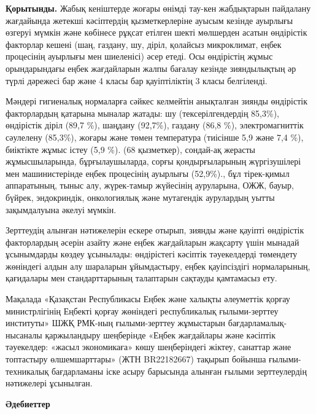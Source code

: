 \begin{multicols}{2}
{\bfseries Қорытынды.} Жабық кеніштерде жоғары өнімді тау-кен жабдықтарын
пайдалану жағдайында жетекші кәсіптердің қызметкерлеріне ауысым кезінде
ауырлығы өзгеруі мүмкін және көбінесе рұқсат етілген шекті мөлшерден
асатын өндірістік факторлар кешені (шаң, газдану, шу, діріл, қолайсыз
микроклимат, еңбек процесінің ауырлығы мен шиеленісі) әсер етеді. Осы
өндірістің жұмыс орындарындағы еңбек жағдайларын жалпы бағалау кезінде
зияндылықтың әр түрлі дәрежесі бар және 4 класы бар қауіптіліктің 3
класы белгіленді.

Мәндері гигиеналық нормаларға сәйкес келмейтін анықталған зиянды
өндірістік факторлардың қатарына мыналар жатады: шу (тексерілгендердің
85,3\%), өндірістік діріл (89,7 \%), шаңдану (92,7\%), газдану (86,8
\%), электромагниттік сәулелену (85,3\%), жоғары және төмен температура
(тиісінше 5,9 және 7,4 \%), биіктікте жұмыс істеу (5,9 \%). (68
қызметкер), сондай-ақ жерасты жұмысшыларында, бұрғылаушыларда, сорғы
қондырғыларының жүргізушілері мен машинистерінде еңбек процесінің
ауырлығы (52,9\%)., бұл тірек-қимыл аппаратының, тыныс алу, жүрек-тамыр
жүйесінің ауруларына, ОЖЖ, бауыр, бүйрек, эндокриндік, онкологиялық және
мутагендік аурулардың уытты зақымдалуына әкелуі мүмкін.

Зерттеудің алынған нәтижелерін ескере отырып, зиянды және қауіпті
өндірістік факторлардың әсерін азайту және еңбек жағдайларын жақсарту
үшін мынадай ұсынымдарды көздеу ұсынылады: өндірістегі кәсіптік
тәуекелдерді төмендету жөніндегі алдын алу шараларын ұйымдастыру, еңбек
қауіпсіздігі нормаларының, қағидалары мен стандарттарының талаптарын
сақтауды қамтамасыз ету.

Мақалада «Қазақстан Республикасы Еңбек және халықты әлеуметтік қорғау
министрлігінің Еңбекті қорғау жөніндегі республикалық ғылыми-зерттеу
институты» ШЖҚ РМК-ның ғылыми-зерттеу жұмыстарын бағдарламалық-нысаналы
қаржыландыру шеңберінде «Еңбек жағдайлары және кәсіптік тәуекелдер:
«жасыл экономикаға» көшу шеңберіндегі жіктеу, санаттар және топтастыру
өлшемшарттары» (ЖТН BR22182667) тақырып бойынша ғылыми-техникалық
бағдарламаны іске асыру барысында алынған ғылыми зерттеулердің
нәтижелері ұсынылған.
\end{multicols}

\begin{center}
{\bfseries Әдебиеттер}
\end{center}

